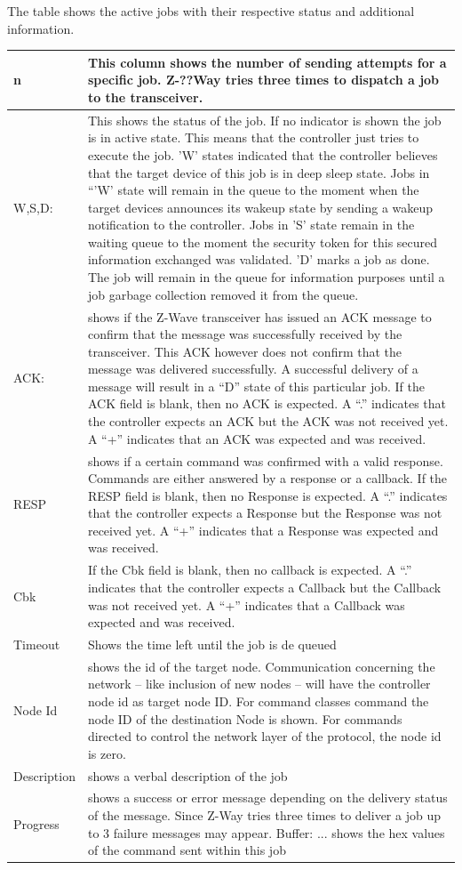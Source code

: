 The table shows the active jobs with their respective status and additional information.

\begin{table} 
\begin{tabular}{|p{}|p{}|} 
\hline
n	&This column shows the number of sending attempts for a specific job. Z-??Way tries three times to dispatch a job to the transceiver.\\ 
\hline 
W,S,D: & This shows the status of the job. If no indicator is shown the job is in active state. This means that the controller just tries to execute the job. 'W' states indicated that the controller believes that the target device of this job is in deep sleep state. Jobs in “'W' state will remain in the queue to the moment when the target devices announces its wakeup state by sending a wakeup notification to the controller. Jobs in 'S' state remain in the waiting queue to the moment the security token for this secured information exchanged was validated.
'D' marks a job as done. The job will remain in the queue for information purposes until a job garbage collection removed it from the queue.\\ 
\hline 
ACK:& shows if the Z-Wave transceiver has issued an ACK message to confirm that the message was successfully received by the transceiver. This ACK however does not confirm that the message was delivered successfully. A successful delivery of a message will result in a “D” state of this particular job.
If the ACK field is blank, then no ACK is expected. A “.” indicates that the controller expects an ACK but the ACK was not received yet. A “+” indicates that an ACK was expected and was received.\\ 
\hline
RESP	&shows if a certain command was confirmed with a valid response. Commands are either answered by a response or a callback.
If the RESP field is blank, then no Response is expected. A “.” indicates that the controller expects a Response but the Response was not received yet. A “+” indicates that a Response was expected and was received.\\ 
\hline
Cbk	&If the Cbk field is blank, then no callback is expected. A “.” indicates that the controller
expects a Callback but the Callback was not received yet. A “+” indicates that a Callback was expected and was received.\\
\hline 
Timeout	&Shows the time left until the job is de queued \\ 
\hline
Node Id	&shows the id of the target node. Communication concerning the network – like inclusion of new nodes – will have the controller node id as target node ID. For command classes command the node ID of the destination Node is shown. For commands directed to control the network layer of the protocol, the node id is zero. \\
\hline
Description	&shows a verbal description of the job \\
\hline
Progress	&shows a success or error message depending on the delivery status of the message. Since Z-Way tries three times to deliver a job up to 3 failure messages may appear.
Buffer: ... shows the hex values of the command sent within this job \\


\end{tabular}
\end{table}
